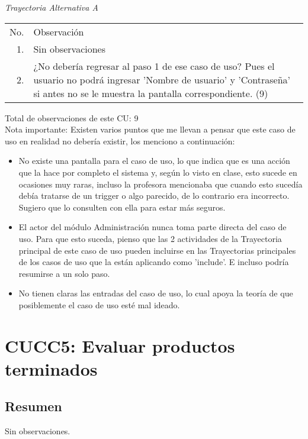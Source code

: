 \documentclass[10pt,spanish]{article}
\providecommand{\tabularnewline}{\\}
\begin{document}
\textit{Trayectoria Alternativa A}

\begin{longtable}{rp{8cm}}
No.  & Observación\tabularnewline
1.  & Sin observaciones\tabularnewline
2.  & ¿No debería regresar al paso 1 de ese caso de uso? Pues el usuario no podrá ingresar 'Nombre de usuario' y 'Contraseña' si antes no se le muestra la pantalla correspondiente. (9)\tabularnewline

\end{longtable}

Total de observaciones de este CU: 9
\\[0.4 cm]
Nota importante: Existen varios puntos que me llevan a pensar que este caso de uso en realidad no debería existir, los menciono a continuación:
\begin{itemize}
	\item{No existe una pantalla para el caso de uso, lo que indica que es una acción que la hace por completo el sistema y, según lo visto en clase, esto sucede en ocasiones muy raras, incluso la profesora mencionaba que cuando esto sucedía debía tratarse de un trigger o algo parecido, de lo contrario era incorrecto. Sugiero que lo consulten con ella para estar más seguros.}
	\item{El actor del módulo Administración nunca toma parte directa del caso de uso. Para que esto suceda, pienso que las 2 actividades de la Trayectoria principal de este caso de uso pueden incluirse en las Trayectorias principales de los casos de uso que la están aplicando como 'include'. E incluso podría resumirse a un solo paso.}
	\item{No tienen claras las entradas del caso de uso, lo cual apoya la teoría de que posiblemente el caso de uso esté mal ideado.}
\end{itemize}


\newpage{} 

\section{CUCC5: Evaluar productos terminados}

\subsection{Resumen}
Sin observaciones.
\end{document}
